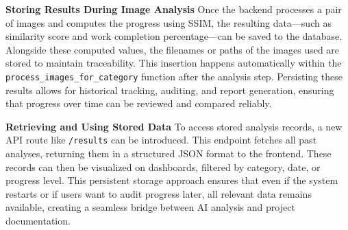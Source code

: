 \documentclass[12pt,a4paper]{report}
\begin{document}
\textbf{Storing Results During Image Analysis}
Once the backend processes a pair of images and computes the progress using SSIM, the resulting data—such as similarity score and work completion percentage—can be saved to the database. Alongside these computed values, the filenames or paths of the images used are stored to maintain traceability. This insertion happens automatically within the \texttt{process\_images\_for\_category} function after the analysis step. Persisting these results allows for historical tracking, auditing, and report generation, ensuring that progress over time can be reviewed and compared reliably.

\textbf{Retrieving and Using Stored Data}
To access stored analysis records, a new API route like \texttt{/results} can be introduced. This endpoint fetches all past analyses, returning them in a structured JSON format to the frontend. These records can then be visualized on dashboards, filtered by category, date, or progress level. This persistent storage approach ensures that even if the system restarts or if users want to audit progress later, all relevant data remains available, creating a seamless bridge between AI analysis and project documentation.

\setlength{\baselineskip}{1.0\baselineskip}
\end{document}
